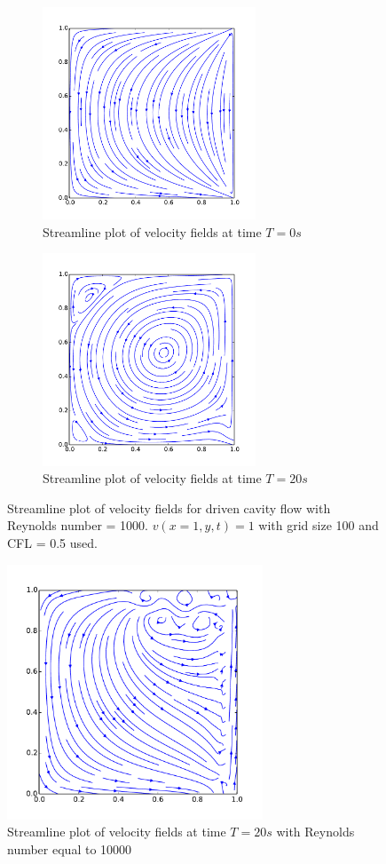 \begin{figure}[H]
	\centering
	\begin{subfigure}[t]{2.5in}
		\centering
		\includegraphics[width=2.5in]{figures/streamline_plot_t_0s_grid_100.pdf}
		\caption{Streamline plot of velocity fields at time $T = 0s$}\label{fig:6.19a}		
	\end{subfigure}
	\quad
	\begin{subfigure}[t]{2.5in}
		\centering
		\includegraphics[width=2.5in]{figures/streamline_plot_t_ 20s_grid_100.pdf}
		\caption{Streamline plot of velocity fields at time $T = 20s$}\label{fig:6.19b}
	\end{subfigure}
	\caption{Streamline plot of velocity fields for driven cavity flow with Reynolds number = 1000. $v(x=1,y,t) = 1$ with grid size 100 and CFL = 0.5 used.}\label{fig:6.19}
\end{figure}

\begin{figure}[H]
	\centering
	\includegraphics[width=3.0in]{figures/streamline_plot_t_20_grid30_Re_10000.pdf}
	\caption{Streamline plot of velocity fields at time $T = 20s$ with Reynolds number equal to 10000}\label{fig:6.20}		
\label{fig:6.20}
\end{figure}

